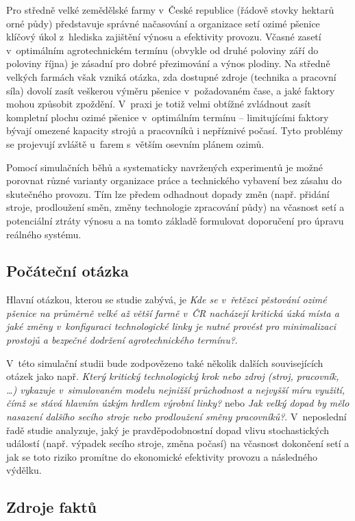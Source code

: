 \documentclass[11pt,a4paper]{article}
\begin{document}
Pro středně velké zemědělské farmy v~České republice (řádově stovky hektarů orné půdy) představuje správné načasování a organizace setí ozimé pšenice klíčový úkol z~hlediska zajištění výnosu a efektivity provozu. Včasné zasetí v~optimálním agrotechnickém termínu (obvykle od druhé poloviny září do poloviny října) je zásadní pro dobré přezimování a výnos plodiny. Na středně velkých farmách však vzniká otázka, zda dostupné zdroje (technika a pracovní síla) dovolí zasít veškerou výměru pšenice v~požadovaném čase, a jaké faktory mohou způsobit zpoždění. V~praxi je totiž velmi obtížné zvládnout zasít kompletní plochu ozimé pšenice v~optimálním termínu -- limitujícími faktory bývají omezené kapacity strojů a pracovníků i nepříznivé počasí. Tyto problémy se projevují zvláště u~farem s~větším osevním plánem ozimů.

Pomocí simulačních běhů a systematicky navržených experimentů je možné porovnat různé varianty organizace práce a technického vybavení bez zásahu do skutečného provozu. Tím lze předem odhadnout dopady změn (např. přidání stroje, prodloužení směn, změny technologie zpracování půdy) na včasnost setí a potenciální ztráty výnosu a na tomto základě formulovat doporučení pro úpravu reálného systému.

\subsection{Počáteční otázka}

Hlavní otázkou, kterou se studie zabývá, je \emph{Kde se v~řetězci pěstování ozimé pšenice na průměrně velké až větší farmě v~ČR nacházejí kritická úzká místa a jaké změny v~konfiguraci technologické linky je nutné provést pro minimalizaci prostojů a bezpečné dodržení agrotechnického termínu?}.

V~této simulační studii bude zodpovězeno také  několik dalších souvisejících otázek jako např. \emph{Který kritický technologický krok nebo zdroj (stroj, pracovník, \dots) vykazuje v~simulovaném modelu nejnižší průchodnost a nejvyšší míru využití, čímž se stává hlavním úzkým hrdlem výrobní linky?} nebo \emph{Jak velký dopad by mělo nasazení dalšího secího stroje nebo prodloužení směny pracovníků?}. V~neposlední řadě studie analyzuje, jaký je pravděpodobnostní dopad vlivu stochastických událostí (např. výpadek secího stroje, změna počasí) na včasnost dokončení setí a jak se toto riziko promítne do ekonomické efektivity provozu a následného výdělku.
\subsection{Zdroje faktů}
\end{document}

